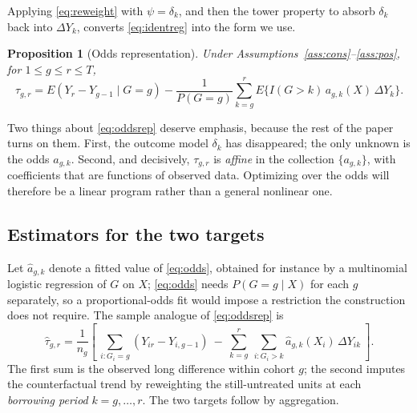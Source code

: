 \documentclass[12pt]{article}
\newtheorem{proposition}{Proposition}
\theoremstyle{remark}
\begin{document}
Applying \eqref{eq:reweight} with $\psi = \delta_k$, and then the tower property to absorb
$\delta_k$ back into $\Delta Y_k$, converts \eqref{eq:identreg} into the form we use.

\begin{proposition}[Odds representation]
\label{prop:oddsrep}
Under Assumptions~\ref{ass:cons}--\ref{ass:pos}, for $1 \le g \le r \le T$,
\begin{equation}
\tau_{g,r} = E(Y_r - Y_{g-1} \mid G{=}g)
 - \frac{1}{P(G{=}g)}\sum_{k=g}^{r} E\big\{ I(G>k)\, a_{g,k}(X)\, \Delta Y_k \big\}.
\label{eq:oddsrep}
\end{equation}
\end{proposition}

Two things about \eqref{eq:oddsrep} deserve emphasis, because the rest of the paper turns
on them. First, the outcome model $\delta_k$ has disappeared; the only unknown is the odds
$a_{g,k}$. Second, and decisively, $\tau_{g,r}$ is \emph{affine} in the collection
$\{a_{g,k}\}$, with coefficients that are functions of observed data. Optimizing over the
odds will therefore be a linear program rather than a general nonlinear one.

\subsection{Estimators for the two targets}
\label{sec:estimators}

Let $\widehat a_{g,k}$ denote a fitted value of \eqref{eq:odds}, obtained for instance by a
multinomial logistic regression of $G$ on $X$; \eqref{eq:odds} needs $P(G{=}g \mid X)$ for
each $g$ separately, so a proportional-odds fit would impose a restriction the
construction does not require. The sample analogue of \eqref{eq:oddsrep} is
\begin{equation}
\widehat\tau_{g,r}
= \frac{1}{n_g}\left[\ \sum_{i : G_i = g}(Y_{ir} - Y_{i,g-1})
 \ -\ \sum_{k=g}^{r}\ \sum_{i : G_i > k} \widehat a_{g,k}(X_i)\,\Delta Y_{ik}\ \right].
\label{eq:cellhat}
\end{equation}
The first sum is the observed long difference within cohort $g$; the second imputes the
counterfactual trend by reweighting the still-untreated units at each \emph{borrowing
period} $k = g, \ldots, r$. The two targets follow by aggregation.
\end{document}
